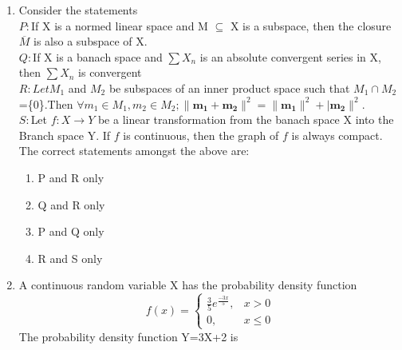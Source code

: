 \documentclass[journal]{IEEEtran}
\begin{document}
\begin{enumerate}[start=1]
$P: \brak{X,\tau}$ is a Hausdroff space.\hspace{1.3cm}
$Q: \brak{X,\tau}$ is a regular space.s\\
$R: \brak{X,\tau}$ is a normal space.\hspace{1.6cm}
$S: \brak{X,\tau}$ is a connected space.
\begin{multicols}{4}
    \begin{enumerate}
        \item P and Q
        \item Q and R
        \item R and S
        \item P and S
    \end{enumerate}
\end{multicols}
\item Consider the statements\\
$P: $If X is a normed linear space and M $\subseteq$ X is a subspace, then the closure $\overline{M}$ is also a subspace of X.\\

$Q: $If X is a banach space and $\sum X_n$ is an absolute convergent series in X, then $\sum X_n$ is convergent\\

$R: Let M_1$ and $M_2$ be subspaces of an inner product space such that $M_1 \cap M_2$=\{0\}.Then $\forall m_1\in M_1 , m_2\in M_2; \|\mathbf{m_1+m_2}\|^2=\|\mathbf{m_1}\|^2+|\mathbf{m_2}\|^2.$\\

$S: $Let $f: X\rightarrow Y$ be a linear transformation from the banach space X into the Branch space Y. If $f$ is continuous, then the graph of $f$ is always compact.\\

The correct statements amongst the above are:
\begin{multicols}{4}
    \begin{enumerate}
        \item P and R only
        \item Q and R only
        \item P and Q only 
        \item R and S only
    \end{enumerate}
\end{multicols}
\item A continuous random variable X has the probability density function \\
\[
f(x)=\begin{cases}
     \frac{3}{5} e^{\frac{-3x}{5}}, & x > 0 \\
     0, & x \leq 0
\end{cases}
\]
The probability density function Y=3X+2 is


\end{enumerate}
\end{document}

